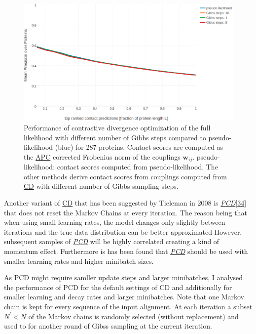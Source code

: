 \documentclass[12pt,a4paper,twoside]{book}
\newcommand{\wij}{\mathbf{w}_{ij}}
\theoremstyle{definition}
\theoremstyle{definition}
\theoremstyle{remark}
\begin{document}
\begin{figure}

{\centering \includegraphics[width=0.9\linewidth]{img/full_likelihood/precision_vs_rank_notitle_cd_comparing_nr_of_gibbs_sampling_steps} 

}

\caption{Performance of contrastive
divergence optimization of the full likelihood with different number of
Gibbs steps compared to pseudo-likelihood (blue) for 287 proteins.
Contact scores are computed as the \protect\hyperlink{abbrev}{APC}
corrected Frobenius norm of the couplings \(\wij\). pseudo-likelihood:
contact scores computed from pseudo-likelihood. The other methods derive
contact scores from couplings computed from
\protect\hyperlink{abbrev}{CD} with different number of Gibbs sampling
steps.}\label{fig:precision-cd-gibbs-steps}
\end{figure}

Another variant of \protect\hyperlink{abbrev}{CD} that has been
suggested by Tieleman in 2008 is
\protect\hyperlink{abbrev}{\emph{PCD}}{[}\protect\hyperlink{ref-Tieleman2008}{34}{]}
that does not reset the Markov Chains at every iteration. The reason
being that when using small learning rates, the model changes only
slightly between iterations and the true data distribution can be better
approximated However, subsequent samples of
\protect\hyperlink{abbrev}{\emph{PCD}} will be highly correlated
creating a kind of momentum effect. Furthermore is has been found that
\protect\hyperlink{abbrev}{\emph{PCD}} should be used with smaller
learning rates and higher minibatch sizes.

As PCD might require samller update steps and larger minibatches, I
analysed the performance of PCD for the default settings of CD and
additionally for smaller learning and decay rates and larger
minibatches. Note that one Markov chain is kept for every sequence of
the input alignment. At each iteration a subset \(N^{\prime} < N\) of
the Markov chains is randomly selected (without replacement) and used to
for another round of Gibss sampling at the current iteration.
\end{document}
